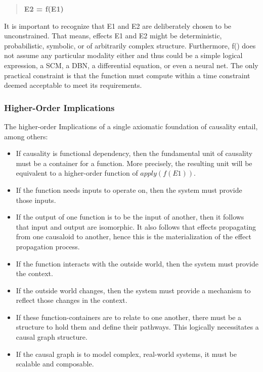 \begin{quotation}
	\textbf{E2 = f(E1)}
\end{quotation}

It is important to recognize that E1 and E2 are deliberately chosen to be unconstrained. That means, effects E1 and E2 might be deterministic, probabilistic, symbolic, or of arbitrarily complex structure. Furthermore, f() does not assume any particular modality either and thus could be a simple logical expression, a SCM, a DBN, a differential equation, or even a neural net. The only practical constraint is that the function must compute within a time constraint deemed acceptable to meet its requirements. 

\subsubsection{Higher-Order Implications}


The higher-order Implications of a single axiomatic foundation of causality entail, among others:

\begin{itemize}
	\item If causality is functional dependency, then the fundamental unit of causality must be a container for a function. More precisely, the resulting unit will be equivalent to a higher-order function of $apply(f(E1))$.
	\item If the function needs inputs to operate on, then the system must provide those inputs.  
	\item If the output of one function is to be the input of another, then it follows that input and output are isomorphic. It also follows that effects propagating from one causaloid to another, hence this is the materialization of the effect propagation process. 
	\item If the function interacts with the outside world, then the system must provide the context. 
	\item If the outside world changes, then the system must provide a mechanism to reflect those changes in the context. 
	\item If these function-containers are to relate to one another, there must be a structure to hold them and define their pathways. This logically necessitates a causal graph structure.
	\item If the causal graph is to model complex, real-world systems, it must be scalable and composable. 
\end{itemize}

